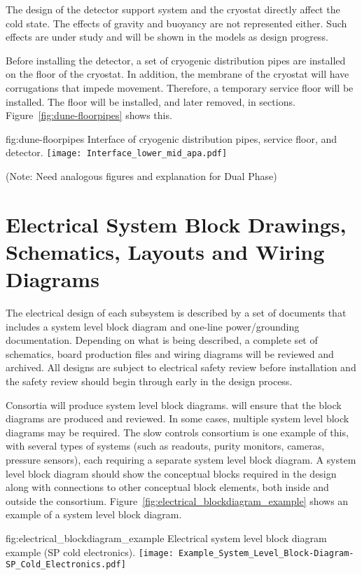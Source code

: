 The design of the detector support system and the cryostat directly
affect the cold state. The effects of gravity and buoyancy are not
represented either. Such effects are under study and will be shown in
the models as design progress.


Before installing the detector, a set of cryogenic distribution
pipes are installed on the floor of the cryostat. In addition, the
membrane of the cryostat will have corrugations that impede
movement. Therefore, a temporary service floor will be installed. The
floor will be installed, and later removed, in
sections. Figure~\ref{fig:dune-floorpipes} shows this.


\begin{dunefigure}{fig:dune-floorpipes} 
{Interface of cryogenic distribution pipes, service floor, and detector.}
  \texttt{[image: Interface\_lower\_mid\_apa.pdf]}
\end{dunefigure}




(Note: Need analogous figures and explanation for Dual Phase)




\section{Electrical System Block Drawings, Schematics, Layouts and Wiring Diagrams}
\label{sec:fdsp-coord-electrical}


The electrical design of each subsystem is described by a
set of documents that includes a system level block
diagram and one-line power/grounding documentation.
Depending on what is being described, a complete set of schematics,
board production files and wiring diagrams will be reviewed and archived.  All
designs are subject to electrical safety review before
installation and the safety review should begin through
 early in the design process.


Consortia will produce system level block
diagrams.  will ensure that the
block diagrams are produced and reviewed.  In some cases, multiple
system level block diagrams may be required.  The slow controls consortium is one example of this, with several types of systems (such as 
readouts, purity monitors, cameras, pressure sensors), each
requiring a separate system level block diagram. A system level block
diagram should show the conceptual blocks required in the design along with connections to other conceptual block elements, both inside and outside the consortium.  
Figure~\ref{fig:electrical_blockdiagram_example} shows an example of a system level block diagram.
\begin{dunefigure}{fig:electrical_blockdiagram_example}
  {Electrical system level block diagram example (SP cold electronics).}
 \texttt{[image: Example\_System\_Level\_Block-Diagram-SP\_Cold\_Electronics.pdf]}
\end{dunefigure}


